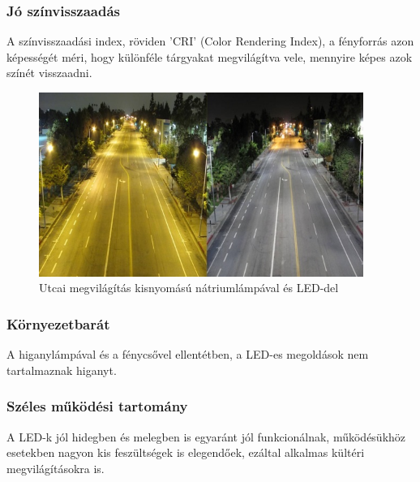 \documentclass[../main.tex]{subfiles}
\begin{document}
        \subsubsection{Jó színvisszaadás}
            A színvisszaadási index, röviden 'CRI' (Color Rendering Index), a fényforrás azon képességét méri, hogy különféle tárgyakat megvilágítva vele, mennyire képes azok színét visszaadni. %
             \begin{figure}[h!] %
                \centering
                \includegraphics[height=6cm]{irodalom_res/cri_los_angeles.jpg}
                \caption{Utcai megvilágítás kisnyomású nátriumlámpával és LED-del} %
             \end{figure}
             
        \subsubsection{Környezetbarát}
            A higanylámpával és a fénycsővel ellentétben, a LED-es megoldások nem tartalmaznak higanyt.
        \subsubsection{Széles működési tartomány}
            A LED-k jól hidegben és melegben is egyaránt jól funkcionálnak, működésükhöz esetekben nagyon kis feszültségek is elegendőek, ezáltal alkalmas kültéri megvilágításokra is.
        
        
\end{document}
